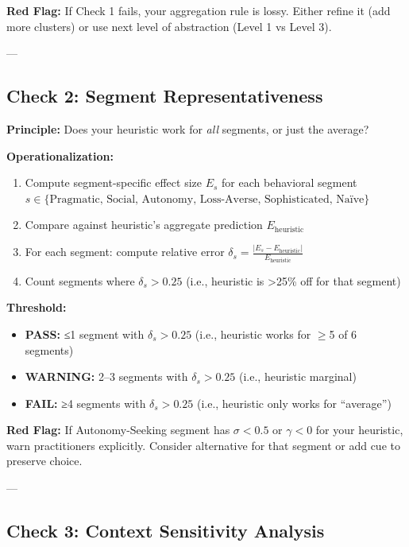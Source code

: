 \textbf{Red Flag:} If Check 1 fails, your aggregation rule is lossy. Either refine it (add more clusters) or use next level of abstraction (Level 1 vs Level 3).

---

\subsection{Check 2: Segment Representativeness}
\label{subsec:20-check-2}

\textbf{Principle:} Does your heuristic work for \textit{all} segments, or just the average?

\textbf{Operationalization:}

\begin{enumerate}
\item Compute segment-specific effect size $E_s$ for each behavioral segment $s \in \{\text{Pragmatic, Social, Autonomy, Loss-Averse, Sophisticated, Naïve}\}$
\item Compare against heuristic's aggregate prediction $E_{\text{heuristic}}$
\item For each segment: compute relative error $\delta_s = \frac{|E_s - E_{\text{heuristic}}|}{E_{\text{heuristic}}}$
\item Count segments where $\delta_s > 0.25$ (i.e., heuristic is >25\% off for that segment)
\end{enumerate}

\textbf{Threshold:}
\begin{itemize}[nosep]
\item \textbf{PASS:} ≤1 segment with $\delta_s > 0.25$ (i.e., heuristic works for $\geq$5 of 6 segments)
\item \textbf{WARNING:} 2--3 segments with $\delta_s > 0.25$ (i.e., heuristic marginal)
\item \textbf{FAIL:} ≥4 segments with $\delta_s > 0.25$ (i.e., heuristic only works for ``average'')
\end{itemize}

\textbf{Red Flag:} If Autonomy-Seeking segment has $\sigma < 0.5$ or $\gamma < 0$ for your heuristic, warn practitioners explicitly. Consider alternative for that segment or add cue to preserve choice.

---

\subsection{Check 3: Context Sensitivity Analysis}
\label{subsec:20-check-3}

